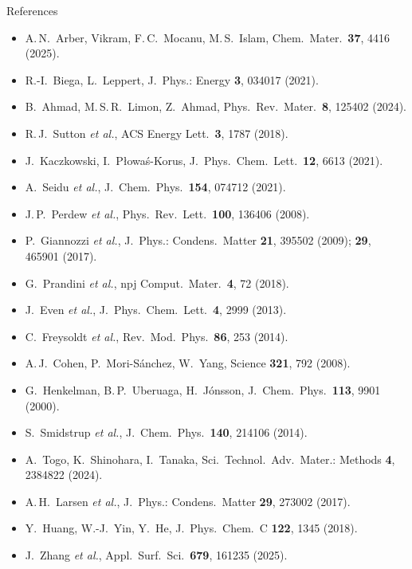 \documentclass[aspectratio=169,10pt]{beamer}
\newcommand{\RA}{[1] A.\,N.~Arber, Vikram, F.\,C.~Mocanu, M.\,S.~Islam, Chem.\ Mater.\ \textbf{37}, 4416 (2025).}
\newcommand{\RB}{[2] R.-I.~Biega, L.~Leppert, J.\ Phys.: Energy \textbf{3}, 034017 (2021).}
\newcommand{\RC}{[3] B.~Ahmad, M.\,S.\,R.~Limon, Z.~Ahmad, Phys.\ Rev.\ Mater.\ \textbf{8}, 125402 (2024).}
\newcommand{\RD}{[4] R.\,J.~Sutton \emph{et al.}, ACS Energy Lett.\ \textbf{3}, 1787 (2018).}
\newcommand{\RE}{[5] J.~Kaczkowski, I.~P{\l}owa\'s-Korus, J.\ Phys.\ Chem.\ Lett.\ \textbf{12}, 6613 (2021).}
\newcommand{\RF}{[6] A.~Seidu \emph{et al.}, J.\ Chem.\ Phys.\ \textbf{154}, 074712 (2021).}
\newcommand{\RI}{[7] J.\,P.~Perdew \emph{et al.}, Phys.\ Rev.\ Lett.\ \textbf{100}, 136406 (2008).}
\newcommand{\RJ}{[8] P.~Giannozzi \emph{et al.}, J.\ Phys.: Condens.\ Matter \textbf{21}, 395502 (2009); \textbf{29}, 465901 (2017).}
\newcommand{\RK}{[9] G.~Prandini \emph{et al.}, npj Comput.\ Mater.\ \textbf{4}, 72 (2018).}
\newcommand{\RL}{[10] J.~Even \emph{et al.}, J.\ Phys.\ Chem.\ Lett.\ \textbf{4}, 2999 (2013).}
\newcommand{\RM}{[11] C.~Freysoldt \emph{et al.}, Rev.\ Mod.\ Phys.\ \textbf{86}, 253 (2014).}
\newcommand{\RN}{[12] A.\,J.~Cohen, P.~Mori-S\'anchez, W.~Yang, Science \textbf{321}, 792 (2008).}
\newcommand{\RO}{[13] G.~Henkelman, B.\,P.~Uberuaga, H.~J\'onsson, J.\ Chem.\ Phys.\ \textbf{113}, 9901 (2000).}
\newcommand{\RP}{[14] S.~Smidstrup \emph{et al.}, J.\ Chem.\ Phys.\ \textbf{140}, 214106 (2014).}
\newcommand{\RQ}{[15] A.~Togo, K.~Shinohara, I.~Tanaka, Sci.\ Technol.\ Adv.\ Mater.: Methods \textbf{4}, 2384822 (2024).}
\newcommand{\RR}{[16] A.\,H.~Larsen \emph{et al.}, J.\ Phys.: Condens.\ Matter \textbf{29}, 273002 (2017).}
\newcommand{\RT}{[18] J.~Zhang \emph{et al.}, Appl.\ Surf.\ Sci.\ \textbf{679}, 161235 (2025).}
\newcommand{\RS}{[17] Y.~Huang, W.-J.~Yin, Y.~He, J.\ Phys.\ Chem.\ C \textbf{122}, 1345 (2018).}
\begin{document}
\begin{frame}[allowframebreaks]{References}
  \tiny
  \begin{itemize}\setlength{\itemsep}{1pt}
    \item[] \RA
    \item[] \RB
    \item[] \RC
    \item[] \RD
    \item[] \RE
    \item[] \RF
    \item[] \RI
    \item[] \RJ
    \item[] \RK
    \item[] \RL
    \item[] \RM
    \item[] \RN
    \item[] \RO
    \item[] \RP
    \item[] \RQ
    \item[] \RR
    \item[] \RS
    \item[] \RT
  \end{itemize}
\end{frame}
\end{document}
